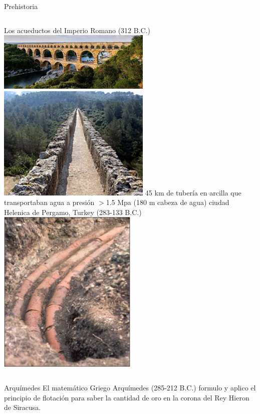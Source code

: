\documentclass [xcolor=svgnames, t] {beamer}
\begin{document}
\begin{frame}{Prehistoria}
\vspace{-0.5cm}
\begin{columns}
Los acueductos del Imperio Romano (312 B.C.)\\
\centering
\includegraphics[width=0.55\textwidth]{romans}
\centering
\includegraphics[width=0.55\textwidth]{romans2}
45 km de tubería en arcilla que transportaban agua a presión $>$1.5 Mpa (180 m cabeza de agua) ciudad Helenica de Pergamo, Turkey (283-133 B.C.) \\
\centering
\includegraphics[width=0.5\textwidth]{pergamo}
\end{columns}
\begin{block}{Arquímedes}
El matemático Griego Arquímedes (285-212 B.C.) formulo y aplico el principio de flotación para saber la cantidad de oro en la corona del Rey Hieron de Siracusa.
\end{block}
\end{frame}
\end{document}
